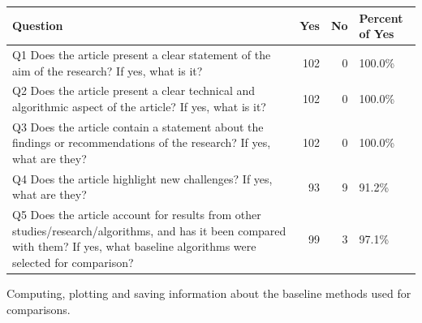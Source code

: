 \documentclass[
]{article}
\begin{document}
\begin{tabular}{l|r|r|l}
\hline
Question & Yes & No & Percent of Yes\\
\hline
Q1 Does the article present a clear statement of the aim of the research? If yes, what is it? & 102 & 0 & 100.0\%\\
\hline
Q2 Does the article present a clear technical and algorithmic aspect of the article? If yes, what is it? & 102 & 0 & 100.0\%\\
\hline
Q3 Does the article contain a statement about the findings or recommendations of the research? If yes, what are they? & 102 & 0 & 100.0\%\\
\hline
Q4 Does the article highlight new challenges? If yes, what are they? & 93 & 9 & 91.2\%\\
\hline
Q5 Does the article account for results from other studies/research/algorithms, and has it been compared with them? If yes, what baseline algorithms were selected for comparison? & 99 & 3 & 97.1\%\\
\hline
\end{tabular}

Computing, plotting and saving information about the baseline methods used for comparisons.
\end{document}
